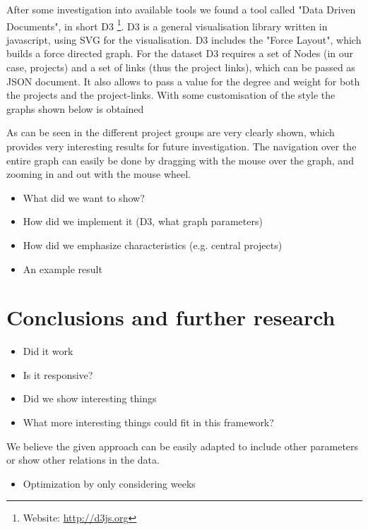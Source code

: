 \documentclass[10pt,a4paper]{article}
\begin{document}
After some investigation into available tools we found a tool called "Data Driven Documents", in short D3 \footnote{Website: \url{http://d3js.org}}. D3 is a general visualisation library written in javascript, using SVG for the visualisation. D3 includes the "Force Layout", which builds a force directed graph. For the dataset D3 requires a set of Nodes (in our case, projects) and a set of links (thus the project links), which can be passed as JSON document. It also allows to pass a value for the degree and weight for both the projects and the project-links. With some customisation of the style the graphs shown below is obtained 

As can be seen in  the different project groups are very clearly shown, which provides very interesting results for future investigation. The navigation over the entire graph can easily be done by dragging with the mouse over the graph, and zooming in and out with the mouse wheel.

\begin{itemize}
    \item What did we want to show?
    \item How did we implement it (D3, what graph parameters)
    \item How did we emphasize characteristics (e.g. central projects)
    \item An example result
\end{itemize}

\section{Conclusions and further research}\label{sec:conclusions}

\begin{itemize}
    \item Did it work
    \item Is it responsive?
    \item Did we show interesting things
    \item What more interesting things could fit in this framework?
\end{itemize}

We believe the given approach can be easily adapted to include other parameters or show other relations in the data.

\begin{itemize}
    \item Optimization by only considering weeks
\end{itemize}



\end{document}

